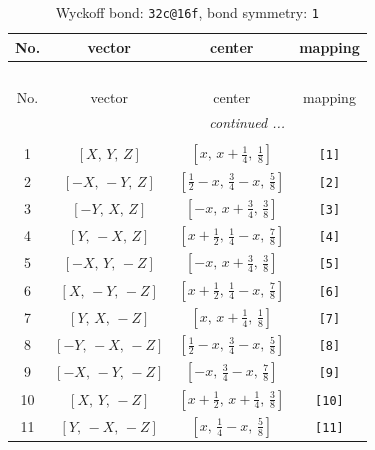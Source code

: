 \documentclass[fleqn,8pt]{jsarticle}
\begin{document}
\begin{longtable}{cccc}
\caption{Wyckoff bond: {\tt 32c@16f}, bond symmetry: {\tt 1}}
 \\
 \hline \hline
No. & vector & center & mapping \\ \hline \endfirsthead

\multicolumn{3}{l}{\tablename\ \thetable{}} \\
 \hline \hline
No. & vector & center & mapping \\ \hline \endhead

 \hline \hline
\multicolumn{3}{r}{\footnotesize\it continued ...} \\ \endfoot

 \hline \hline
\multicolumn{3}{r}{} \\ \endlastfoot

1 & $\left[ X,\, Y,\, Z \right]$ & $\left[ x,\, x + \frac{1}{4},\, \frac{1}{8} \right]$ & {\tt [1]} \\ \hline
2 & $\left[ - X,\, - Y,\, Z \right]$ & $\left[ \frac{1}{2} - x,\, \frac{3}{4} - x,\, \frac{5}{8} \right]$ & {\tt [2]} \\ \hline
3 & $\left[ - Y,\, X,\, Z \right]$ & $\left[ - x,\, x + \frac{3}{4},\, \frac{3}{8} \right]$ & {\tt [3]} \\ \hline
4 & $\left[ Y,\, - X,\, Z \right]$ & $\left[ x + \frac{1}{2},\, \frac{1}{4} - x,\, \frac{7}{8} \right]$ & {\tt [4]} \\ \hline
5 & $\left[ - X,\, Y,\, - Z \right]$ & $\left[ - x,\, x + \frac{3}{4},\, \frac{3}{8} \right]$ & {\tt [5]} \\ \hline
6 & $\left[ X,\, - Y,\, - Z \right]$ & $\left[ x + \frac{1}{2},\, \frac{1}{4} - x,\, \frac{7}{8} \right]$ & {\tt [6]} \\ \hline
7 & $\left[ Y,\, X,\, - Z \right]$ & $\left[ x,\, x + \frac{1}{4},\, \frac{1}{8} \right]$ & {\tt [7]} \\ \hline
8 & $\left[ - Y,\, - X,\, - Z \right]$ & $\left[ \frac{1}{2} - x,\, \frac{3}{4} - x,\, \frac{5}{8} \right]$ & {\tt [8]} \\ \hline
9 & $\left[ - X,\, - Y,\, - Z \right]$ & $\left[ - x,\, \frac{3}{4} - x,\, \frac{7}{8} \right]$ & {\tt [9]} \\ \hline
10 & $\left[ X,\, Y,\, - Z \right]$ & $\left[ x + \frac{1}{2},\, x + \frac{1}{4},\, \frac{3}{8} \right]$ & {\tt [10]} \\ \hline
11 & $\left[ Y,\, - X,\, - Z \right]$ & $\left[ x,\, \frac{1}{4} - x,\, \frac{5}{8} \right]$ & {\tt [11]} \\ \hline

\end{longtable}
\end{document}
